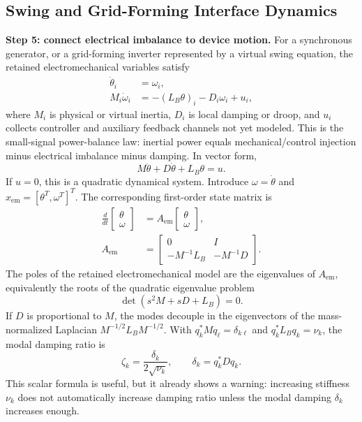 \documentclass[conference]{IEEEtran}
\begin{document}
\subsection{Swing and Grid-Forming Interface Dynamics}

\noindent\textbf{Step 5: connect electrical imbalance to device motion.}
For a synchronous generator, or a grid-forming inverter represented by a virtual
swing equation, the retained electromechanical variables satisfy
\begin{align}
  \dot\theta_i &= \omega_i, \label{eq:thetadot}\\
  M_i\dot\omega_i &=
  - (L_B\theta)_i - D_i\omega_i + u_i,
  \label{eq:swing}
\end{align}
where $M_i$ is physical or virtual inertia, $D_i$ is local damping or droop, and
$u_i$ collects controller and auxiliary feedback channels not yet modeled. This
is the small-signal power-balance law: inertial power equals mechanical/control
injection minus electrical imbalance minus damping.
In vector form,
\begin{equation}
  M\ddot\theta+D\dot\theta+L_B\theta=u.
  \label{eq:secondorderbasic}
\end{equation}
If $u=0$, this is a quadratic dynamical system. Introduce
$\omega=\dot\theta$ and $x_{\mathrm{em}}=[\theta^T,\omega^T]^T$. The
corresponding first-order state matrix is
\begin{align}
  \frac{d}{dt}
  \begin{bmatrix}\theta\\\omega\end{bmatrix}
  &=
  A_{\mathrm{em}}
  \begin{bmatrix}\theta\\\omega\end{bmatrix},
  \label{eq:em_state}\\
  A_{\mathrm{em}}
  &=
  \begin{bmatrix}
  0&I\\
  -M^{-1}L_B&-M^{-1}D
  \end{bmatrix}.
  \label{eq:aem_def}
\end{align}
The poles of the retained electromechanical model are the eigenvalues of
$A_{\mathrm{em}}$, equivalently the roots of the quadratic eigenvalue problem
\begin{equation}
  \det(s^2M+sD+L_B)=0.
  \label{eq:qep_basic}
\end{equation}
If $D$ is proportional to $M$, the modes decouple in the eigenvectors of the
mass-normalized Laplacian $M^{-1/2}L_BM^{-1/2}$. With
$q_k^\ast M q_\ell=\delta_{k\ell}$ and $q_k^\ast L_B q_k=\nu_k$, the modal
damping ratio is
\begin{equation}
  \zeta_k=\frac{\delta_k}{2\sqrt{\nu_k}},
  \qquad
  \delta_k=q_k^\ast D q_k.
  \label{eq:modalzeta}
\end{equation}
This scalar formula is useful, but it already shows a warning: increasing
stiffness $\nu_k$ does not automatically increase damping ratio unless the
modal damping $\delta_k$ increases enough.
\end{document}
